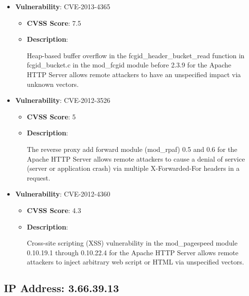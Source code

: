 \documentclass{article}
\begin{document}
\begin{itemize}
        \item \textbf{Vulnerability}: CVE-2013-4365
        \begin{itemize}
            \item \textbf{CVSS Score}:  7.5 
            \item \textbf{Description}:
            \parbox[t]{0.9\linewidth}{
                \ttfamily Heap-based buffer overflow in the fcgid\_header\_bucket\_read function in fcgid\_bucket.c in the mod\_fcgid module before 2.3.9 for the Apache HTTP Server allows remote attackers to have an unspecified impact via unknown vectors.
            }
        \end{itemize}
    
        \item \textbf{Vulnerability}: CVE-2012-3526
        \begin{itemize}
            \item \textbf{CVSS Score}:  5 
            \item \textbf{Description}:
            \parbox[t]{0.9\linewidth}{
                \ttfamily The reverse proxy add forward module (mod\_rpaf) 0.5 and 0.6 for the Apache HTTP Server allows remote attackers to cause a denial of service (server or application crash) via multiple X-Forwarded-For headers in a request.
            }
        \end{itemize}
    
        \item \textbf{Vulnerability}: CVE-2012-4360
        \begin{itemize}
            \item \textbf{CVSS Score}:  4.3 
            \item \textbf{Description}:
            \parbox[t]{0.9\linewidth}{
                \ttfamily Cross-site scripting (XSS) vulnerability in the mod\_pagespeed module 0.10.19.1 through 0.10.22.4 for the Apache HTTP Server allows remote attackers to inject arbitrary web script or HTML via unspecified vectors.
            }
        \end{itemize}
    
\end{itemize}




\clearpage



\subsection*{IP Address: 3.66.39.13}
\end{document}
